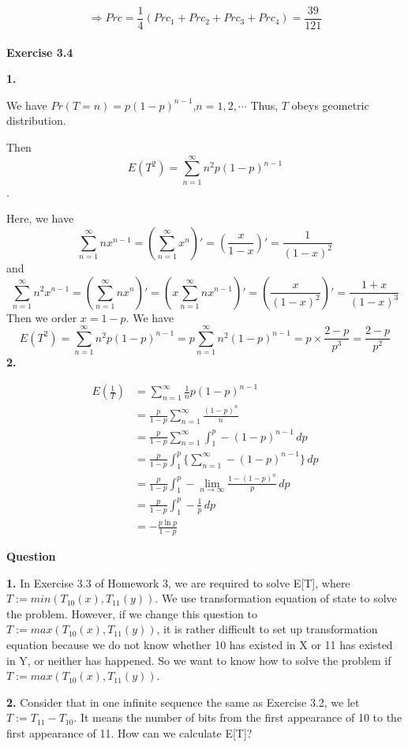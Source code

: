 \documentclass{article} %
\begin{document}
	$$\Rightarrow Prc=\frac{1}{4}(Prc_1+Prc_2+Prc_3+Prc_4) = \frac{39}{121} $$\\
	





	\textbf{Exercise 3.4}\par

	\textbf{1.}\par We have $Pr(T=n)=p(1-p)^{n-1}$,$n=1,2,\cdots$ Thus, $T$ obeys geometric distribution.\par
	Then $$E(T^2)=\sum_{n=1}^\infty n^2p(1-p)^{n-1}$$.\par
	Here, we have 
	$$
	\sum_{n=1}^\infty nx^{n-1}=(\sum_{n=1}^\infty x^n)'=(\frac{x}{1-x})'=\frac{1}{(1-x)^2}
	$$
	and 
	$$
	\sum_{n=1}^\infty n^2x^{n-1}=(\sum_{n=1}^\infty nx^n)'=(x\sum_{n=1}^\infty nx^{n-1})'=(\frac{x}{(1-x)^2})'=\frac{1+x}{(1-x)^3}
	$$
	Then we order $x=1-p$. We have 
	$$
	E(T^2)=\sum_{n=1}^\infty n^2p(1-p)^{n-1}=p\sum_{n=1}^\infty n^2(1-p)^{n-1}=p\times \frac{2-p}{p^3}=\frac{2-p}{p^2}
	$$
	\textbf{2.}\par
	\begin{align*}
	E(\frac{1}{T})&=\sum_{n=1}^\infty \frac{1}{n} p(1-p)^{n-1}\\
	&=\frac{p}{1-p}\sum_{n=1}^\infty \frac{(1-p)^n}{n}\\
	&=\frac{p}{1-p}\sum_{n=1}^\infty \int_{1}^{p}-(1-p)^{n-1}\,dp\\
	&=\frac{p}{1-p}\int_{1}^{p}\{\sum_{n=1}^\infty -(1-p)^{n-1}\}\,dp\\
	&=\frac{p}{1-p}\int_{1}^{p}-\lim_{n\to\infty}\frac{1-(1-p)^{n}}{p}\,dp\\
	&=\frac{p}{1-p}\int_{1}^{p}-\frac{1}{p}\,dp\\
	&=-\frac{p\ln p}{1-p}
	\end{align*}\par


	\textbf{Question}\par


	\textbf{1.}   In Exercise 3.3 of Homework 3, we are required to solve  E[T], where $T := min(T_{10} (x),T_{11} (y)).$ We use transformation equation of state to solve the problem. However, if we change this question to $T := max(T_{10} (x),T_{11} (y))$, it is rather difficult to set up transformation equation because we do not know whether 10 has existed in X or 11 has existed in Y, or neither has happened. So we want to know how to solve the problem if $T := max(T_{10} (x),T_{11} (y))$.\par
	\textbf{2.}   Consider that in one infinite sequence the same as Exercise 3.2, we let $T:=T_{11}-T_{10}$. It means the number of bits from the first appearance of 10 to the first appearance of 11. How can we calculate E[T]? 

	
\end{document}

